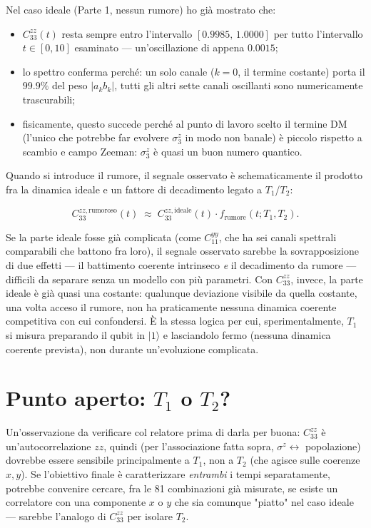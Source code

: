 \documentclass[11pt,a4paper]{article}
\newcommand{\ket}[1]{\lvert #1 \rangle}
\begin{document}
Nel caso ideale (Parte 1, nessun rumore) ho già mostrato che:
\begin{itemize}
\item $C_{33}^{zz}(t)$ resta sempre entro l'intervallo $[0.9985,\,1.0000]$ per tutto l'intervallo $t\in[0,10]$ esaminato — un'oscillazione di appena $0.0015$;
\item lo spettro conferma perché: un solo canale ($k=0$, il termine costante) porta il $99.9\%$ del peso $|a_kb_k|$, tutti gli altri sette canali oscillanti sono numericamente trascurabili;
\item fisicamente, questo succede perché al punto di lavoro scelto il termine DM (l'unico che potrebbe far evolvere $\sigma_3^z$ in modo non banale) è piccolo rispetto a scambio e campo Zeeman: $\sigma_3^z$ è quasi un buon numero quantico.
\end{itemize}

Quando si introduce il rumore, il segnale osservato è schematicamente il prodotto fra la dinamica ideale e un fattore di decadimento legato a $T_1$/$T_2$:

\begin{equation}
C_{33}^{zz,\text{rumoroso}}(t) \;\approx\; C_{33}^{zz,\text{ideale}}(t)\cdot f_{\text{rumore}}(t;T_1,T_2).
\end{equation}

Se la parte ideale fosse già complicata (come $C_{11}^{yy}$, che ha sei canali spettrali comparabili che battono fra loro), il segnale osservato sarebbe la sovrapposizione di due effetti — il battimento coerente intrinseco \emph{e} il decadimento da rumore — difficili da separare senza un modello con più parametri. Con $C_{33}^{zz}$, invece, la parte ideale è già quasi una costante: qualunque deviazione visibile da quella costante, una volta acceso il rumore, non ha praticamente nessuna dinamica coerente competitiva con cui confondersi. È la stessa logica per cui, sperimentalmente, $T_1$ si misura preparando il qubit in $\ket{1}$ e lasciandolo fermo (nessuna dinamica coerente prevista), non durante un'evoluzione complicata.

\section{Punto aperto: $T_1$ o $T_2$?}

Un'osservazione da verificare col relatore prima di darla per buona: $C_{33}^{zz}$ è un'autocorrelazione $zz$, quindi (per l'associazione fatta sopra, $\sigma^z\leftrightarrow$ popolazione) dovrebbe essere sensibile principalmente a $T_1$, non a $T_2$ (che agisce sulle coerenze $x,y$). Se l'obiettivo finale è caratterizzare \emph{entrambi} i tempi separatamente, potrebbe convenire cercare, fra le 81 combinazioni già misurate, se esiste un correlatore con una componente $x$ o $y$ che sia comunque "piatto" nel caso ideale — sarebbe l'analogo di $C_{33}^{zz}$ per isolare $T_2$.
\end{document}
